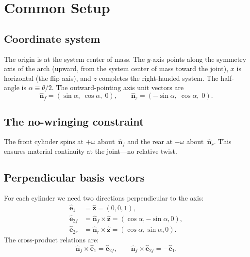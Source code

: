 \documentclass[11pt]{article}
\newcommand{\uv}[1]{\hat{\bm{#1}}}
\newcommand{\zhat}{\uv{z}}
\newcommand{\nf}{\uv{n}_{\!f}}
\newcommand{\nr}{\uv{n}_{\!r}}
\begin{document}
\section{Common Setup}
\label{sec:setup}

\subsection{Coordinate system}

The origin is at the system center of mass.  The $y$-axis points along
the symmetry axis of the arch (upward, from the system center of mass
toward the joint), $x$ is horizontal (the flip axis), and $z$ completes
the right-handed system.  The half-angle is $\alpha\equiv\theta/2$.
The outward-pointing axis unit vectors are
\begin{equation}\label{eq:axes}
\nf = (\sin\alpha,\;\cos\alpha,\;0), \qquad
\nr = (-\sin\alpha,\;\cos\alpha,\;0).
\end{equation}

\subsection{The no-wringing constraint}

The front cylinder spins at $+\omega$ about~$\nf$ and the rear at
$-\omega$ about~$\nr$.  This ensures material continuity at the
joint---no relative twist.

\subsection{Perpendicular basis vectors}

For each cylinder we need two directions perpendicular to the axis:
\begin{align}
\uv{e}_1 &= \zhat = (0,0,1), \label{eq:e1}\\
\uv{e}_{2f} &= \nf\times\zhat = (\cos\alpha,-\sin\alpha,0), \label{eq:e2f}\\
\uv{e}_{2r} &= \nr\times\zhat = (\cos\alpha,\sin\alpha,0). \label{eq:e2r}
\end{align}
The cross-product relations are:
\begin{equation}\label{eq:crossrels}
\nf\times\uv{e}_1 = \uv{e}_{2f},\qquad
\nf\times\uv{e}_{2f} = -\uv{e}_1.
\end{equation}
\end{document}
